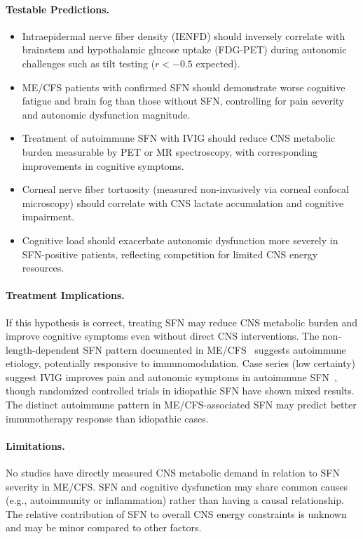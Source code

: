 \begin{speculation}
\paragraph{Testable Predictions.}
\begin{itemize}
    \item Intraepidermal nerve fiber density (IENFD) should inversely correlate with brainstem and hypothalamic glucose uptake (FDG-PET) during autonomic challenges such as tilt testing ($r < -0.5$ expected).
    \item ME/CFS patients with confirmed SFN should demonstrate worse cognitive fatigue and brain fog than those without SFN, controlling for pain severity and autonomic dysfunction magnitude.
    \item Treatment of autoimmune SFN with IVIG should reduce CNS metabolic burden measurable by PET or MR spectroscopy, with corresponding improvements in cognitive symptoms.
    \item Corneal nerve fiber tortuosity (measured non-invasively via corneal confocal microscopy) should correlate with CNS lactate accumulation and cognitive impairment.
    \item Cognitive load should exacerbate autonomic dysfunction more severely in SFN-positive patients, reflecting competition for limited CNS energy resources.
\end{itemize}

\paragraph{Treatment Implications.}
If this hypothesis is correct, treating SFN may reduce CNS metabolic burden and improve cognitive symptoms even without direct CNS interventions. The non-length-dependent SFN pattern documented in ME/CFS~\cite{Azcue2023sfn} suggests autoimmune etiology, potentially responsive to immunomodulation. Case series (low certainty) suggest IVIG improves pain and autonomic symptoms in autoimmune SFN~\cite{Liu2020IVIG,Oaklander2016autoimmuneSFN}, though randomized controlled trials in idiopathic SFN have shown mixed results. The distinct autoimmune pattern in ME/CFS-associated SFN may predict better immunotherapy response than idiopathic cases.

\paragraph{Limitations.}
No studies have directly measured CNS metabolic demand in relation to SFN severity in ME/CFS. SFN and cognitive dysfunction may share common causes (e.g., autoimmunity or inflammation) rather than having a causal relationship. The relative contribution of SFN to overall CNS energy constraints is unknown and may be minor compared to other factors.


\end{speculation}
